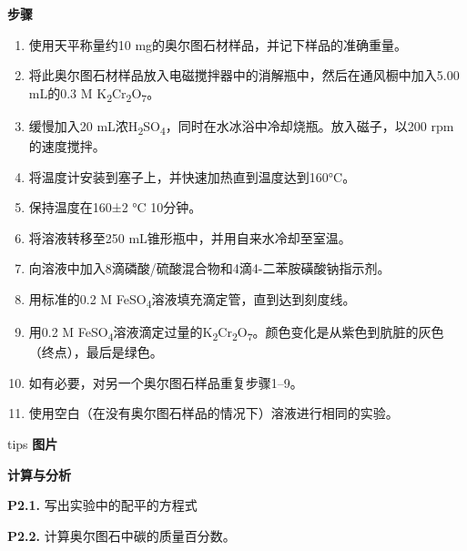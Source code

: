 \textbf{步骤}

\begin{enumerate}
\tightlist
\item
  使用天平称量约10 mg的奥尔图石材样品，并记下样品的准确重量。
\item
  将此奥尔图石材样品放入电磁搅拌器中的消解瓶中，然后在通风橱中加入5.00
  mL的0.3 M K\textsubscript{2}Cr\textsubscript{2}O\textsubscript{7}。
\item
  缓慢加入20
  mL浓H\textsubscript{2}SO\textsubscript{4}，同时在水冰浴中冷却烧瓶。放入磁子，以200
  rpm的速度搅拌。
\item
  将温度计安装到塞子上，并快速加热直到温度达到160°C。
\item
  保持温度在160±2 °C 10分钟。
\item
  将溶液转移至250 mL锥形瓶中，并用自来水冷却至室温。
\item
  向溶液中加入8滴磷酸/硫酸混合物和4滴4-二苯胺磺酸钠指示剂。
\item
  用标准的0.2 M FeSO\textsubscript{4}溶液填充滴定管，直到达到刻度线。
\item
  用0.2 M
  FeSO\textsubscript{4}溶液滴定过量的K\textsubscript{2}Cr\textsubscript{2}O\textsubscript{7}。颜色变化是从紫色到肮脏的灰色（终点），最后是绿色。
\item
  如有必要，对另一个奥尔图石样品重复步骤1--9。
\item
  使用空白（在没有奥尔图石样品的情况下）溶液进行相同的实验。
\end{enumerate}

tips \textbf{图片}

\textbf{计算与分析}

\noindent\textbf{P2.1.} 写出实验中的配平的方程式

\noindent\textbf{P2.2.} 计算奥尔图石中碳的质量百分数。
